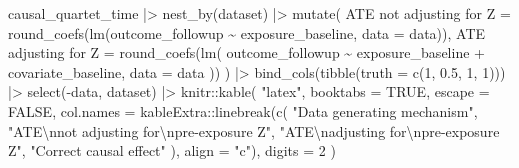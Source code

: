 \documentclass[
  letterpaper,
  DIV=11,
  numbers=noendperiod]{scrartcl}
\newenvironment{Shaded}{\begin{snugshade}}{\end{snugshade}}
\newcommand{\AttributeTok}[1]{\textcolor[rgb]{0.40,0.45,0.13}{#1}}
\newcommand{\ConstantTok}[1]{\textcolor[rgb]{0.56,0.35,0.01}{#1}}
\newcommand{\DecValTok}[1]{\textcolor[rgb]{0.68,0.00,0.00}{#1}}
\newcommand{\FloatTok}[1]{\textcolor[rgb]{0.68,0.00,0.00}{#1}}
\newcommand{\FunctionTok}[1]{\textcolor[rgb]{0.28,0.35,0.67}{#1}}
\newcommand{\NormalTok}[1]{\textcolor[rgb]{0.00,0.23,0.31}{#1}}
\newcommand{\OtherTok}[1]{\textcolor[rgb]{0.00,0.23,0.31}{#1}}
\newcommand{\SpecialCharTok}[1]{\textcolor[rgb]{0.37,0.37,0.37}{#1}}
\newcommand{\StringTok}[1]{\textcolor[rgb]{0.13,0.47,0.30}{#1}}
\begin{document}
\begin{Shaded}
\begin{Highlighting}[]
\NormalTok{causal\_quartet\_time }\SpecialCharTok{|\textgreater{}}
  \FunctionTok{nest\_by}\NormalTok{(dataset) }\SpecialCharTok{|\textgreater{}}
  \FunctionTok{mutate}\NormalTok{(}
    \StringTok{\textasciigrave{}}\AttributeTok{ATE not adjusting for Z}\StringTok{\textasciigrave{}} \OtherTok{=}
      \FunctionTok{round\_coefs}\NormalTok{(}\FunctionTok{lm}\NormalTok{(outcome\_followup }\SpecialCharTok{\textasciitilde{}}\NormalTok{ exposure\_baseline, }\AttributeTok{data =}\NormalTok{ data)),}
    \StringTok{\textasciigrave{}}\AttributeTok{ATE adjusting for Z}\StringTok{\textasciigrave{}} \OtherTok{=}
      \FunctionTok{round\_coefs}\NormalTok{(}\FunctionTok{lm}\NormalTok{(}
\NormalTok{        outcome\_followup }\SpecialCharTok{\textasciitilde{}}\NormalTok{ exposure\_baseline }\SpecialCharTok{+}\NormalTok{ covariate\_baseline,}
        \AttributeTok{data =}\NormalTok{ data}
\NormalTok{      ))}
\NormalTok{  ) }\SpecialCharTok{|\textgreater{}}
  \FunctionTok{bind\_cols}\NormalTok{(}\FunctionTok{tibble}\NormalTok{(}\AttributeTok{truth =} \FunctionTok{c}\NormalTok{(}\DecValTok{1}\NormalTok{, }\FloatTok{0.5}\NormalTok{, }\DecValTok{1}\NormalTok{, }\DecValTok{1}\NormalTok{))) }\SpecialCharTok{|\textgreater{}}
  \FunctionTok{select}\NormalTok{(}\SpecialCharTok{{-}}\NormalTok{data, dataset) }\SpecialCharTok{|\textgreater{}}
\NormalTok{  knitr}\SpecialCharTok{::}\FunctionTok{kable}\NormalTok{(}
    \StringTok{"latex"}\NormalTok{,}
    \AttributeTok{booktabs =} \ConstantTok{TRUE}\NormalTok{,}
    \AttributeTok{escape =} \ConstantTok{FALSE}\NormalTok{,}
    \AttributeTok{col.names =}\NormalTok{ kableExtra}\SpecialCharTok{::}\FunctionTok{linebreak}\NormalTok{(}\FunctionTok{c}\NormalTok{(}
      \StringTok{"Data generating mechanism"}\NormalTok{,}
      \StringTok{"ATE}\SpecialCharTok{\textbackslash{}n}\StringTok{not adjusting for}\SpecialCharTok{\textbackslash{}n}\StringTok{pre{-}exposure Z"}\NormalTok{,}
      \StringTok{"ATE}\SpecialCharTok{\textbackslash{}n}\StringTok{adjusting for}\SpecialCharTok{\textbackslash{}n}\StringTok{pre{-}exposure Z"}\NormalTok{,}
      \StringTok{"Correct causal effect"}
\NormalTok{    ), }\AttributeTok{align =} \StringTok{"c"}\NormalTok{),}
    \AttributeTok{digits =} \DecValTok{2}
\NormalTok{  )}
\end{Highlighting}
\end{Shaded}
\end{document}
